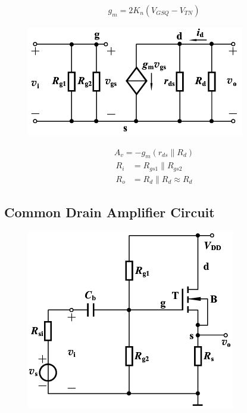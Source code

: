 \begin{equation*}
  \begin{aligned}
    g_m = 2 K_n \left( V_{GSQ} - V_{TN} \right)
  \end{aligned}
\end{equation*}

\begin{figure}[H]
  \centering
  \includegraphics[width=0.5\linewidth]{figures/MOSFET-Common-Ss}
  \label{fig:}
\end{figure}

\begin{equation*}
  \begin{aligned}
    A_v = - g_m \left( r_{ds} \parallel R_d \right)
  \end{aligned}
\end{equation*}
\begin{equation*}
  \begin{aligned}
    R_i &= R_{gs1} \parallel R_{gs2} \\
    R_o &= R_d \parallel R_d \approx R_d
  \end{aligned}
\end{equation*}

\subsection{Common Drain Amplifier Circuit}

\begin{figure}[H]
  \centering
  \includegraphics[width=0.5\linewidth]{figures/MOSFET-Common-D}
  \label{fig:}
\end{figure}

